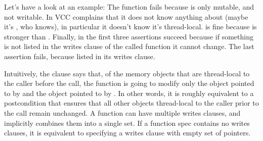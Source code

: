 Let's have a look at an example:
\noindent
The function  fails because  is only
mutable, and not writable.
In  VCC complains that it does not know
anything about  (maybe it's , who knows),
in particular it doesn't know it's thread-local.
 is fine because \vcc{\mutable} is stronger
than .
Finally, in  the first three assertions succeed
because if something is not listed in the writes clause
of the called function it cannot change.
The last assertion fails, because  listed 
in its writes clause.



Intuitively, the clause  says that, 
of the memory objects that are thread-local to the caller before the call,
the function is going to modify only the object pointed to by 
and the object pointed to by .
In other words, it is roughly equivalent to a postcondition that ensures
that all other objects thread-local to the caller prior
to the call remain unchanged.
A function can have multiple writes clauses, and implicitly
combines them into a single set. If a function spec contains no writes clauses, 
it is equivalent to specifying a writes clause with empty set of
pointers.


